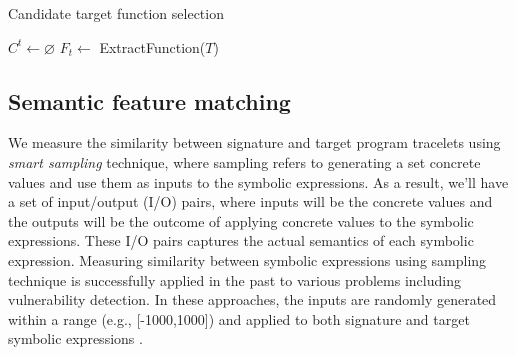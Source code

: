 \begin{algorithm}[t]                  
\footnotesize
\caption{Candidate target function selection }          
\label{alg:candid_func}             
\begin{spacing}{1.2}    
    $C^t \leftarrow \varnothing$\;
    $F_t \leftarrow$ \textsf{ExtractFunction($T$)}\;\label{algo1_sec:extract_func}
    \;
  \setcounter{AlgoLine}{0}
\end{spacing}
\end{algorithm}


\subsection{Semantic feature matching}

We measure the similarity between signature and target program tracelets using \textit{smart sampling} technique, where sampling refers to generating a set concrete values and use them as inputs to the symbolic expressions. As a result, we'll have a set of input/output (I/O) pairs, where inputs will be the concrete values and the outputs will be the outcome of applying concrete values to the symbolic expressions. These I/O pairs captures the actual semantics of each symbolic expression. Measuring similarity between symbolic expressions using sampling technique is successfully applied in the past to various problems \cite{pewnycross}\cite{lakhotia2013fast} including vulnerability detection. In these approaches, the inputs are randomly generated within a range (e.g., [-1000,1000]) and applied to both signature and target symbolic expressions \cite{pewnycross}. 

